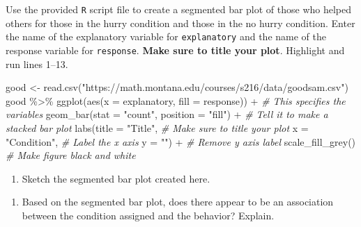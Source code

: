 \documentclass[
]{report}
\newenvironment{Shaded}{\begin{snugshade}}{\end{snugshade}}
\newcommand{\AttributeTok}[1]{\textcolor[rgb]{0.77,0.63,0.00}{#1}}
\newcommand{\CommentTok}[1]{\textcolor[rgb]{0.56,0.35,0.01}{\textit{#1}}}
\newcommand{\FunctionTok}[1]{\textcolor[rgb]{0.00,0.00,0.00}{#1}}
\newcommand{\NormalTok}[1]{#1}
\newcommand{\OtherTok}[1]{\textcolor[rgb]{0.56,0.35,0.01}{#1}}
\newcommand{\SpecialCharTok}[1]{\textcolor[rgb]{0.00,0.00,0.00}{#1}}
\newcommand{\StringTok}[1]{\textcolor[rgb]{0.31,0.60,0.02}{#1}}
\providecommand{\tightlist}{%
  \setlength{\itemsep}{0pt}\setlength{\parskip}{0pt}}
\begin{document}
Use the provided \texttt{R} script file to create a segmented bar plot of those who helped others for those in the hurry condition and those in the no hurry condition. Enter the name of the explanatory variable for \texttt{explanatory} and the name of the response variable for \texttt{response}. \textbf{Make sure to title your plot}. Highlight and run lines 1--13.

\begin{Shaded}
\begin{Highlighting}[]
\NormalTok{good }\OtherTok{\textless{}{-}} \FunctionTok{read.csv}\NormalTok{(}\StringTok{"https://math.montana.edu/courses/s216/data/goodsam.csv"}\NormalTok{)}
\NormalTok{good }\SpecialCharTok{\%\textgreater{}\%}
        \FunctionTok{ggplot}\NormalTok{(}\FunctionTok{aes}\NormalTok{(}\AttributeTok{x =}\NormalTok{ explanatory, }\AttributeTok{fill =}\NormalTok{ response)) }\SpecialCharTok{+}   \CommentTok{\# This specifies the variables}
  \FunctionTok{geom\_bar}\NormalTok{(}\AttributeTok{stat =} \StringTok{"count"}\NormalTok{, }\AttributeTok{position =} \StringTok{"fill"}\NormalTok{) }\SpecialCharTok{+}  \CommentTok{\# Tell it to make a stacked bar plot}
  \FunctionTok{labs}\NormalTok{(}\AttributeTok{title =} \StringTok{"Title"}\NormalTok{,  }\CommentTok{\# Make sure to title your plot }
       \AttributeTok{x =} \StringTok{"Condition"}\NormalTok{,   }\CommentTok{\# Label the x axis}
       \AttributeTok{y =} \StringTok{""}\NormalTok{) }\SpecialCharTok{+}  \CommentTok{\# Remove y axis label}
    \FunctionTok{scale\_fill\_grey}\NormalTok{()  }\CommentTok{\# Make figure black and white}
\end{Highlighting}
\end{Shaded}

\begin{enumerate}
\def\labelenumi{\arabic{enumi}.}
\setcounter{enumi}{1}
\tightlist
\item
  Sketch the segmented bar plot created here.
\end{enumerate}

\vspace{1.5in}

\begin{enumerate}
\def\labelenumi{\arabic{enumi}.}
\setcounter{enumi}{2}
\tightlist
\item
  Based on the segmented bar plot, does there appear to be an association between the condition assigned and the behavior? Explain.
\end{enumerate}

\vspace{1in}
\end{document}
